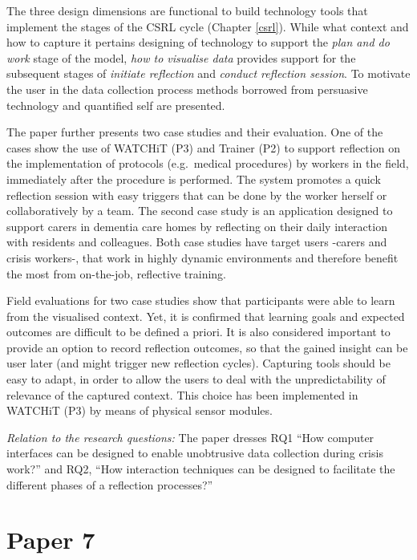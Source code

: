 The three design dimensions are functional to build technology tools that implement the stages of the CSRL cycle (Chapter \ref{csrl}). While what context and how to capture it pertains designing of technology to support the \emph{plan and do work} stage of the model, \emph{how to visualise data} provides support for the subsequent stages of \emph{initiate reflection} and \emph{conduct reflection session}. To motivate the user in the data collection process methods borrowed from persuasive technology and quantified self are presented.

The paper further presents two case studies and their evaluation. One of the cases show the use of WATCHiT (P3) and Trainer (P2) to support reflection on the implementation of protocols (e.g.~medical procedures) by workers in the field, immediately after the procedure is performed. The system promotes a quick reflection session with easy triggers that can be done by the worker herself or collaboratively by a team. The second case study is an application designed to support carers in dementia care homes by reflecting on their daily interaction with residents and colleagues. Both case studies have target users -carers and crisis workers-, that work in highly dynamic environments and therefore benefit the most from on-the-job, reflective training.

Field evaluations for two case studies show that participants were able to learn from the visualised context. Yet, it is confirmed that learning goals and expected outcomes are difficult to be defined a priori. It is also considered important to provide an option to record reflection outcomes, so that the gained insight can be user later (and might trigger new reflection cycles). Capturing tools should be easy to adapt, in order to allow the users to deal with the unpredictability of relevance of the captured context. This choice has been implemented in WATCHiT (P3) by means of physical sensor modules.

\emph{Relation to the research questions: } The paper dresses RQ1 ``How computer interfaces can be designed to enable unobtrusive data collection during crisis work?'' and RQ2, ``How interaction techniques can be designed to facilitate the different phases of a reflection processes?''

\section[A Unified Architecture for Supporting Direct Tag-Based and Indirect Network-Based Resource Discovery]{Paper 7}\label{paper-7}

